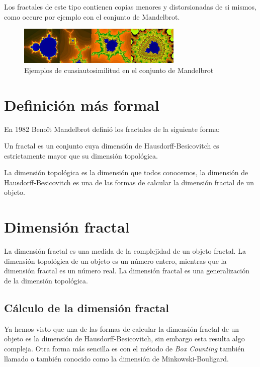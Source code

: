 \noindent
Los fractales de este tipo contienen copias menores y distorsionadas de si mismos, como occure por ejemplo con el conjunto de Mandelbrot.

\begin{figure}[H]
    \centering
    \includegraphics[width=0.7\textwidth]{figures/mandelbrot-cuasi.png}
    \caption{Ejemplos de cuasiautosimilitud en el conjunto de Mandelbrot}
\end{figure}

\section{Definición más formal}

\noindent En 1982 Benoît Mandelbrot definió los fractales de la siguiente forma:

\begin{definition}
Un fractal es un conjunto cuya dimensión de Hausdorff-Besicovitch es estrictamente mayor que su dimensión topológica. \cite{Atencia_2014}
\end{definition}

\noindent La dimensión topológica es la dimensión que todos conocemos, la dimensión de Hausdorff-Besicovitch es una de las formas de calcular la dimensión fractal de un objeto. 

\section{Dimensión fractal}

\noindent La dimensión fractal es una medida de la complejidad de un objeto fractal. La dimensión topológica de un objeto es un número entero, mientras que la dimensión fractal es un número real. La dimensión fractal es una generalización de la dimensión topológica.

\subsection{Cálculo de la dimensión fractal}

\noindent Ya hemos visto que una de las formas de calcular la dimensión fractal de un objeto es la dimensión de Hausdorff-Besicovitch, sin embargo esta resulta algo compleja. Otra forma más sencilla es con el método de \textit{Box Counting} también llamado o también conocido como la dimensión de Minkowski-Bouligard.\\


